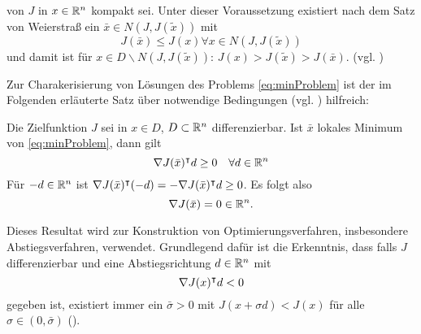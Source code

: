   

 von $J$ in $x\in \mathbb{R}^n$ kompakt sei. Unter dieser Voraussetzung existiert nach dem Satz von Weierstraß ein $\bar x \in N(J,J(\tilde x))$ mit 
 \[
  J(\bar x) \leq J(x) \forall x\in N(J,J(\tilde x))
 \]
 und damit ist für $x\in D\backslash N(J,J(\tilde x))$: $J(x)>J(\tilde x)> J(\bar x)$. (vgl. \cite[Satz 1.2.2]{alt2002nichtlineare})
 

Zur Charakerisierung von Lösungen des Problems \eqref{eq:minProblem} ist der im Folgenden erläuterte Satz über notwendige Bedingungen (vgl. \cite[vgl. Satz 3.1.1 ff.]{alt2002nichtlineare}) hilfreich:
\begin{theorem} 
\label{thm:optnotbed}
 Die Zielfunktion $J$ sei in $x\in D$, $D\subset \mathbb{R}^n$ differenzierbar. Ist $\bar x$ lokales Minimum von \eqref{eq:minProblem}, dann gilt
 \[
  \nabla J(\bar x)^\intercal d \geq 0 \quad \forall d\in \mathbb{R}^n
 \]
 Für $-d\in \mathbb{R}^n$ ist $\nabla J(\bar x)^\intercal (-d) =  - \nabla J(\bar x)^\intercal d  \geq 0$. Es folgt also
 \[
  \nabla J(\bar x)  =0 \in \mathbb{R}^n.
 \]
\end{theorem}

Dieses Resultat wird zur Konstruktion von Optimierungsverfahren, insbesondere Abstiegsverfahren, verwendet. 
Grundlegend dafür ist die Erkenntnis, dass falls $J$ differenzierbar und eine Abstiegsrichtung $d\in \mathbb{R}^n$ mit 
\[
\nabla J(x)^\intercal d<0 
\]
gegeben ist, existiert immer ein $\bar \sigma>0$ mit $J(x+\sigma d)< J(x)$ für alle $\sigma \in (0,\bar \sigma)$ (\cite[vgl. Satz 4.1.1]{alt2002nichtlineare}).




